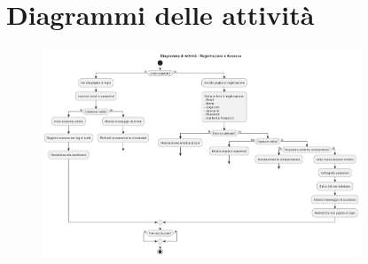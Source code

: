 \documentclass[12pt,a4paper,oneside]{report}
\begin{document}
\section{Diagrammi delle attività}
\begin{figure}[H]
    \centering
    \includegraphics[width=0.85\textwidth]{images/uml/RegistrationLogin.png}
\end{figure}
\end{document}

